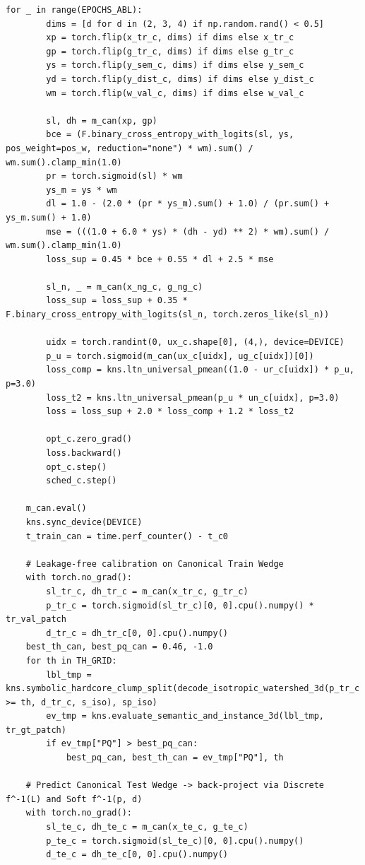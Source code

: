 \documentclass[10pt,a4paper]{article}
\renewcommand{\_}{\origunderscore\allowbreak}
\begin{document}
\begin{codebox}
\begin{lstlisting}[style=pybmed]
    for _ in range(EPOCHS_ABL):
        dims = [d for d in (2, 3, 4) if np.random.rand() < 0.5]
        xp = torch.flip(x_tr_c, dims) if dims else x_tr_c
        gp = torch.flip(g_tr_c, dims) if dims else g_tr_c
        ys = torch.flip(y_sem_c, dims) if dims else y_sem_c
        yd = torch.flip(y_dist_c, dims) if dims else y_dist_c
        wm = torch.flip(w_val_c, dims) if dims else w_val_c

        sl, dh = m_can(xp, gp)
        bce = (F.binary_cross_entropy_with_logits(sl, ys, pos_weight=pos_w, reduction="none") * wm).sum() / wm.sum().clamp_min(1.0)
        pr = torch.sigmoid(sl) * wm
        ys_m = ys * wm
        dl = 1.0 - (2.0 * (pr * ys_m).sum() + 1.0) / (pr.sum() + ys_m.sum() + 1.0)
        mse = (((1.0 + 6.0 * ys) * (dh - yd) ** 2) * wm).sum() / wm.sum().clamp_min(1.0)
        loss_sup = 0.45 * bce + 0.55 * dl + 2.5 * mse

        sl_n, _ = m_can(x_ng_c, g_ng_c)
        loss_sup = loss_sup + 0.35 * F.binary_cross_entropy_with_logits(sl_n, torch.zeros_like(sl_n))

        uidx = torch.randint(0, ux_c.shape[0], (4,), device=DEVICE)
        p_u = torch.sigmoid(m_can(ux_c[uidx], ug_c[uidx])[0])
        loss_comp = kns.ltn_universal_pmean((1.0 - ur_c[uidx]) * p_u, p=3.0)
        loss_t2 = kns.ltn_universal_pmean(p_u * un_c[uidx], p=3.0)
        loss = loss_sup + 2.0 * loss_comp + 1.2 * loss_t2

        opt_c.zero_grad()
        loss.backward()
        opt_c.step()
        sched_c.step()

    m_can.eval()
    kns.sync_device(DEVICE)
    t_train_can = time.perf_counter() - t_c0

    # Leakage-free calibration on Canonical Train Wedge
    with torch.no_grad():
        sl_tr_c, dh_tr_c = m_can(x_tr_c, g_tr_c)
        p_tr_c = torch.sigmoid(sl_tr_c)[0, 0].cpu().numpy() * tr_val_patch
        d_tr_c = dh_tr_c[0, 0].cpu().numpy()
    best_th_can, best_pq_can = 0.46, -1.0
    for th in TH_GRID:
        lbl_tmp = kns.symbolic_hardcore_clump_split(decode_isotropic_watershed_3d(p_tr_c >= th, d_tr_c, s_iso), sp_iso)
        ev_tmp = kns.evaluate_semantic_and_instance_3d(lbl_tmp, tr_gt_patch)
        if ev_tmp["PQ"] > best_pq_can:
            best_pq_can, best_th_can = ev_tmp["PQ"], th

    # Predict Canonical Test Wedge -> back-project via Discrete f^-1(L) and Soft f^-1(p, d)
    with torch.no_grad():
        sl_te_c, dh_te_c = m_can(x_te_c, g_te_c)
        p_te_c = torch.sigmoid(sl_te_c)[0, 0].cpu().numpy()
        d_te_c = dh_te_c[0, 0].cpu().numpy()


\end{lstlisting}
\end{codebox}
\end{document}
